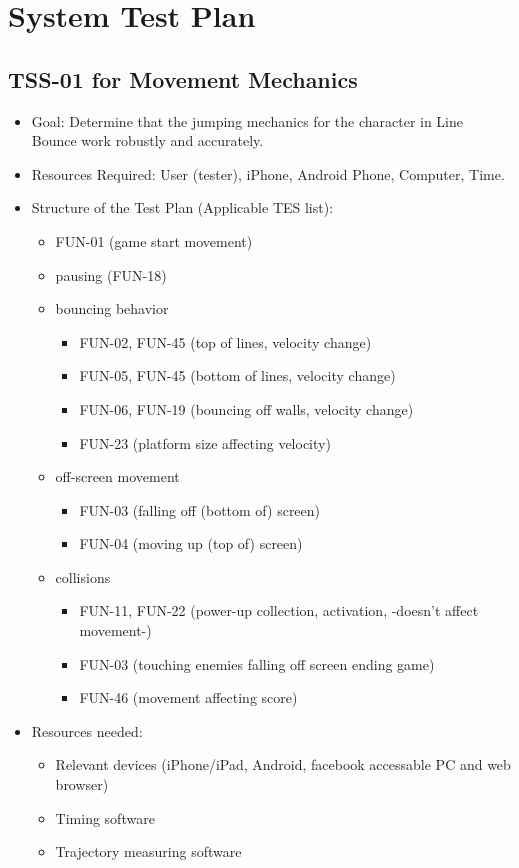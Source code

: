 \chapter{System Test Plan}
\section{TSS-01 for Movement Mechanics }
\begin{itemize}
\item Goal: Determine that the jumping mechanics for the character in Line
Bounce work robustly and accurately. 
\item Resources Required: User (tester), iPhone, Android Phone, Computer,
Time. 
\item Structure of the Test Plan (Applicable TES list): 

\begin{itemize}
\item FUN-01 (game start movement) 
\item pausing (FUN-18) 
\item bouncing behavior 

\begin{itemize}
\item FUN-02, FUN-45 (top of lines, velocity change) 
\item FUN-05, FUN-45 (bottom of lines, velocity change) 
\item FUN-06, FUN-19 (bouncing off walls, velocity change) 
\item FUN-23 (platform size affecting velocity) 
\end{itemize}
\item off-screen movement 

\begin{itemize}
\item FUN-03 (falling off (bottom of) screen) 
\item FUN-04 (moving up (top of) screen) 
\end{itemize}
\item collisions 

\begin{itemize}
\item FUN-11, FUN-22 (power-up collection, activation, -doesn\textquoteright{}t
affect movement-) 
\item FUN-03 (touching enemies falling off screen ending game) 
\item FUN-46 (movement affecting score) 
\end{itemize}
\end{itemize}
\item Resources needed: 

\begin{itemize}
\item Relevant devices (iPhone/iPad, Android, facebook accessable PC and
web browser) 
\item Timing software 
\item Trajectory measuring software
\end{itemize}
\end{itemize}

